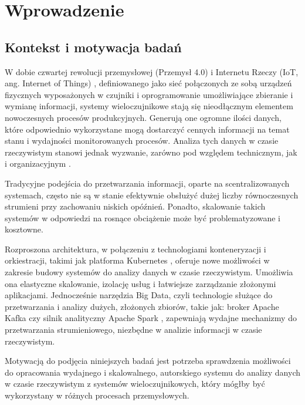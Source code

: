 \section{Wprowadzenie}
\label{sec:wprowadzenie}

\subsection{Kontekst i motywacja badań}
\label{subsec:kontekst}

W dobie czwartej rewolucji przemysłowej (Przemysł 4.0) \cite{przemysl40_iot_ogolnie} i Internetu Rzeczy (IoT, ang. Internet of Things) \cite{iot_definition_aws}, definiowanego jako sieć połączonych ze sobą urządzeń fizycznych wyposażonych w czujniki i oprogramowanie umożliwiające zbieranie i wymianę informacji, systemy wieloczujnikowe stają się nieodłącznym 
elementem nowoczesnych procesów produkcyjnych. Generują one ogromne ilości danych, które odpowiednio wykorzystane mogą dostarczyć
cennych informacji na temat stanu i wydajności monitorowanych procesów. Analiza tych danych w czasie rzeczywistym stanowi jednak
wyzwanie, zarówno pod względem technicznym, jak i organizacyjnym \cite{realtime_challenges}.

Tradycyjne podejścia do przetwarzania informacji, oparte na scentralizowanych systemach, często nie są w stanie efektywnie obsłużyć
dużej liczby równoczesnych strumieni przy zachowaniu niskich opóźnień. Ponadto, skalowanie takich systemów w odpowiedzi na rosnące
obciążenie może być problematyzowane i kosztowne.

Rozproszona architektura, w połączeniu z technologiami konteneryzacji i orkiestracji, takimi jak platforma Kubernetes \cite{kubernetes_benefits},
oferuje nowe możliwości w zakresie budowy systemów do analizy danych w czasie rzeczywistym. Umożliwia ona elastyczne skalowanie,
izolację usług i łatwiejsze zarządzanie złożonymi aplikacjami. Jednocześnie narzędzia Big Data, czyli technologie służące do przetwarzania i analizy dużych, złożonych zbiorów, takie jak: broker Apache Kafka czy silnik analityczny Apache Spark \cite{kafka, spark_streaming}, zapewniają
wydajne mechanizmy do przetwarzania strumieniowego, niezbędne w analizie informacji w czasie rzeczywistym.

Motywacją do podjęcia niniejszych badań jest potrzeba sprawdzenia możliwości do opracowania wydajnego i skalowalnego, autorskiego systemu do
analizy danych w czasie rzeczywistym z systemów wieloczujnikowych, który mógłby być wykorzystany w różnych procesach przemysłowych.

